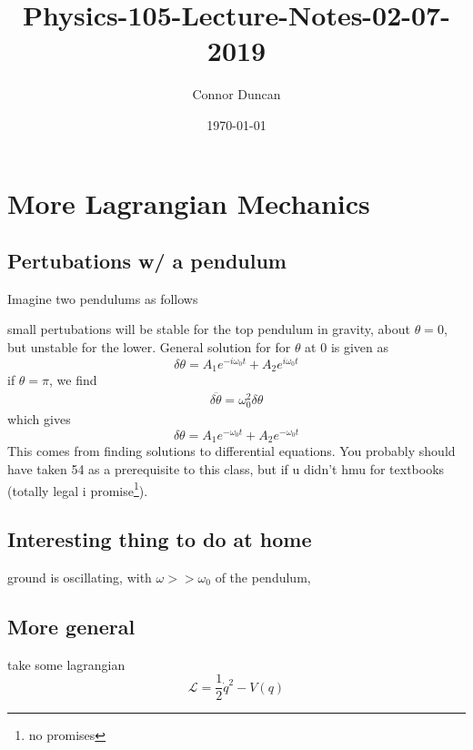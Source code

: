 \documentclass{article} \usepackage{amsmath} \usepackage{amssymb} \usepackage{amsthm} \usepackage[margin=0.2in]{geometry} \usepackage{hyperref} \usepackage{physics} \usepackage{tikz} \usepackage{mathtools} \mathtoolsset{showonlyrefs} \theoremstyle{definition} \newtheorem{theorem}{Theorem}[section] \newtheorem{corollary}{Corollary}[theorem] \newtheorem{lemma}[theorem]{Lemma} \newtheorem{definition}{Definition}[section] \author{Connor Duncan} \date{\today}
\title{Physics-105-Lecture-Notes-02-07-2019}
\begin{document}
\maketitle\tableofcontents
\noindent{}
\section{More Lagrangian Mechanics} \subsection{Pertubations w/ a pendulum} Imagine two pendulums as follows \begin{center}  \end{center} small pertubations will be stable for the top pendulum in gravity, about $\theta=0$, but unstable for the lower. General solution for for $\theta$ at 0 is given as \begin{equation} \delta\theta=A_1e^{-i\omega_0t}+A_2e^{i\omega_0t} \end{equation} if $\theta=\pi$, we find \begin{align} \delta\ddot\theta=\omega_0^2\delta\theta \end{align} which gives \begin{equation} \delta\theta=A_1e^{-\omega_0t}+A_2e^{-\omega_0t} \end{equation} This comes from finding solutions to differential equations. You probably should have taken 54 as a prerequisite to this class, but if u didn't hmu for textbooks (totally legal i promise\footnote{no promises}). \subsection{Interesting thing to do at home} \begin{center}  \end{center} ground is oscillating, with $\omega>>\omega_0$ of the pendulum, \subsection{More general} take some lagrangian \begin{equation} \mathcal{L}=\frac{1}{2}\dot{q}^2-V(q) \end{equation} 
\end{document}
